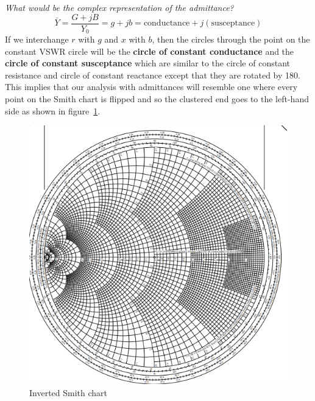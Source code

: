 \emph{What would be the complex representation of the admittance?}
\begin{dmath*}
\bar{Y}=\frac{G + jB}{Y_0} = g + jb
= \text{conductance} + j (\text{susceptance})
\end{dmath*}
If we interchange $r$ with $g$ and $x$ with $b$, then the circles through the point on the constant VSWR circle will be the \textbf{circle of constant conductance} and the \textbf{circle of constant susceptance} which are similar to the circle of constant resistance and circle of constant reactance except that they are rotated by 180\textdegree\;. This implies that our analysis with admittances will resemble one where every point on the Smith chart is flipped and so the clustered end goes to the left-hand side as shown in figure~\ref{fig:invertedsmithchart}.
\begin{figure}[h]
\centering
\includegraphics*[width=0.7\linewidth]{./graphics/inverted_smith_chart}
\caption{Inverted Smith chart}\label{fig:invertedsmithchart}
\end{figure}

